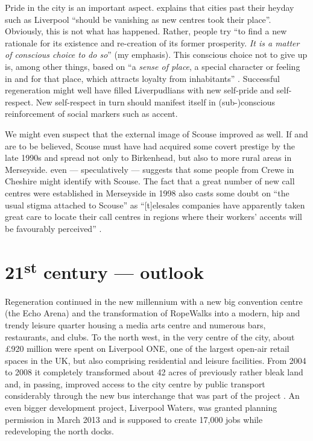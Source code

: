Pride in the city is an important aspect.
\citet[20]{fraser2003} explains that cities past their heyday such as Liverpool ``should be vanishing as new centres took their place''.
Obviously, this is not what has happened.
Rather, people try ``to find a new rationale for its existence and re-creation of its former prosperity. \emph{It is a matter of conscious choice to do so}'' (my emphasis).
This conscious choice not to give up is, among other things, based on ``a \emph{sense of place}, a special character or feeling in and for that place, which attracts loyalty from inhabitants'' \citep[23, emphasis in the original]{fraser2003}.
Successful regeneration might well have filled Liverpudlians with new self-pride and self-respect.
New self-respect in turn should manifest itself in (sub-)conscious reinforcement of social markers such as accent.

We might even suspect that the external image of Scouse improved as well.
If \citet[73]{trudgill1999} and \citet[110]{honeybone2007} are to be believed, Scouse must have had acquired some covert prestige by the late 1990s and spread not only to Birkenhead, but also to more rural areas in Merseyside.
\citet[176--177]{montgomery2007a} even --- speculatively --- suggests that some people from Crewe in Cheshire might identify with Scouse.
The fact that a great number of new call centres were established in Merseyside in 1998 also casts some doubt on ``the usual stigma attached to Scouse'' as ``[t]elesales companies have apparently taken great care to locate their call centres in regions where their workers' accents will be favourably perceived'' \citep[3]{foulkesdocherty1999a}.

	\section{21\textsuperscript{st} century --- outlook}\label{sec.hist.21}

Regeneration continued in the new millennium with a new big convention centre (the Echo Arena) and the transformation of RopeWalks into a modern, hip and trendy leisure quarter housing a media arts centre and numerous bars, restaurants, and clubs.
To the north west, in the very centre of the city, about £920 million were spent on Liverpool ONE, one of the largest open-air retail spaces in the UK, but also comprising residential and leisure facilities.
From 2004 to 2008 it completely transformed about 42 acres of previously rather bleak land and, in passing, improved access to the city centre by public transport considerably through the new bus interchange that was part of the project \parencite[cf.][478--479]{murden2006}.
An even bigger development project, Liverpool Waters, was granted planning permission in March 2013 and is supposed to create 17,000 jobs while redeveloping the north docks.

